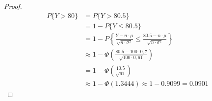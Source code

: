 \documentclass[a4paper]{scrartcl}
\begin{document}
\begin{enumerate}[label=\bfseries\arabic*.]
\begin{enumerate}[label=(\alph*)]
\begin{proof}
                    \begin{equation*}
                        \begin{split}
                            P\{Y > 80\} &= P\{Y > \num{80,5}\} \\
                            &= 1 - P\{Y \leq \num{80,5}\} \\
                            &= 1 - P \left\lbrace
                            \frac{Y - n \cdot \mu}{\sqrt{n \cdot \sigma^2}}
                            \leq
                            \frac{\num{80,5} - n \cdot \mu}
                                 {\sqrt{n\cdot \sigma^2}}
                            \right\rbrace \\
                            &\approx 1 - \Phi \left(
                            \frac{\num{80,5} - 100 \cdot 0,7}{\sqrt{100 \cdot 0,61}}
                            \right) \\
                            &= 1 - \Phi \left( \frac{\num{10,5}}
                                                    {\sqrt{61}} \right) \\
                            &\approx 1 - \Phi(\num{1,3444})
                            \approx 1 - \num{0,9099} = \num{0,0901}
                        \end{split}
                    \end{equation*}
                \end{proof}
            

        \end{enumerate}


\end{enumerate}
\end{document}
